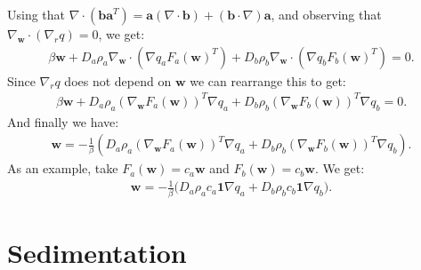 \documentclass[11pt, a4paper]{article}
\theoremstyle{definition}
\newcommand{\adja}{q_a}
\newcommand{\adjb}{q_b}
\newcommand{\ra}{\rho_a}
\newcommand{\rb}{\rho_b}
\newcommand{\w}{\mathbf{w}}
\begin{document}
Using that $\nabla \cdot (\mathbf{b a}^T) = \mathbf a (\nabla \cdot \mathbf b) + (\mathbf b \cdot \nabla) \mathbf a$, and observing that $\nabla_{\w} \cdot (\nabla_r q) = 0$, we get:
\begin{align*}
\beta \w  + D_a \ra \nabla_{\w} \cdot \left(\nabla \adja F_a(\w)^T \right) 
+ D_b \rb \nabla_{\w} \cdot \left(\nabla \adjb F_b(\w)^T \right) = 0.
\end{align*} 
Since $\nabla_r q$ does not depend on $\w$ we can rearrange this to get:
\begin{align*}
\beta \w  + D_a \ra \left(\nabla_\w F_a(\w)\right)^T \nabla \adja  
+ D_b \rb \left(\nabla_\w F_b(\w)\right)^T \nabla \adjb = 0.
\end{align*}
And finally we have:
\begin{align*}
\w = - \frac{1}{\beta} \left( D_a \ra \left(\nabla_\w F_a(\w)\right)^T \nabla \adja  
+ D_b \rb \left(\nabla_\w F_b(\w)\right)^T \nabla \adjb \right).
\end{align*}
As an example, take $F_a(\w) = c_a \w$ and $F_b(\w) = c_b \w$. We get:
\begin{align*}
\w  = - \frac{1}{\beta}\bigg( D_a  \ra c_a \mathbf 1 \nabla \adja + D_b \rb c_b \mathbf 1 \nabla \adjb \bigg).
\end{align*}









	
\section{Sedimentation}	
\end{document}
